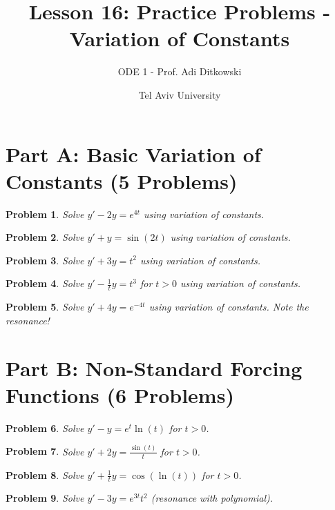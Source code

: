 \documentclass[12pt]{article}
\title{Lesson 16: Practice Problems - Variation of Constants}
\author{ODE 1 - Prof. Adi Ditkowski}
\date{Tel Aviv University}
\newtheorem{problem}{Problem}
\begin{document}
\maketitle

\section*{Part A: Basic Variation of Constants (5 Problems)}

\begin{problem}
Solve $y' - 2y = e^{4t}$ using variation of constants.
\end{problem}

\begin{problem}
Solve $y' + y = \sin(2t)$ using variation of constants.
\end{problem}

\begin{problem}
Solve $y' + 3y = t^2$ using variation of constants.
\end{problem}

\begin{problem}
Solve $y' - \frac{1}{t}y = t^3$ for $t > 0$ using variation of constants.
\end{problem}

\begin{problem}
Solve $y' + 4y = e^{-4t}$ using variation of constants. Note the resonance!
\end{problem}

\section*{Part B: Non-Standard Forcing Functions (6 Problems)}

\begin{problem}
Solve $y' - y = e^t \ln(t)$ for $t > 0$.
\end{problem}

\begin{problem}
Solve $y' + 2y = \frac{\sin(t)}{t}$ for $t > 0$.
\end{problem}

\begin{problem}
Solve $y' + \frac{1}{t}y = \cos(\ln(t))$ for $t > 0$.
\end{problem}

\begin{problem}
Solve $y' - 3y = e^{3t}t^2$ (resonance with polynomial).
\end{problem}
\end{document}
